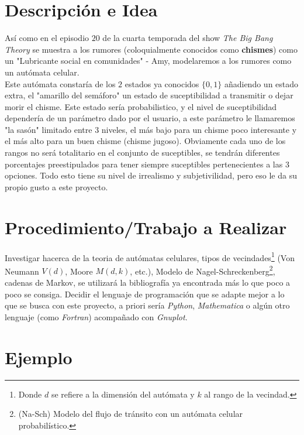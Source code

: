 \vspace{0.5cm}

\section*{Descripción e Idea}

\noindent Así como en el episodio $20$ de la cuarta temporada del show \textit{The Big Bang Theory} se muestra a los rumores (coloquialmente conocidos como \textbf{chismes}) como un "Lubricante social en comunidades" - Amy, modelaremos a los rumores como un autómata celular. \\


\noindent Este autómata constaría de los $2$ estados ya conocidos $\{ 0,1 \}$ añadiendo un estado extra, el "amarillo del semáforo" un estado de suceptibilidad a transmitir o dejar morir el chisme. Este estado sería probabilistico, y el nivel de suceptibilidad dependería de un parámetro dado por el usuario, a este parámetro le llamaremos "la sasón" limitado entre $3$ niveles, el más bajo para un chisme poco interesante y el más alto para un buen chisme (chisme jugoso). Obviamente cada uno de los rangos no será totalitario en el conjunto de suceptibles, se tendrán diferentes porcentajes preestipulados para tener siempre suceptibles pertenecientes a las $3$ opciones. Todo esto tiene su nivel de irrealismo y subjetivilidad, pero eso le da su propio gusto a este proyecto.



\section*{Procedimiento/Trabajo a Realizar}

\noindent Investigar hacerca de la teoria de autómatas celulares, tipos de vecindades\footnote{Donde $d$ se refiere a la dimensión del autómata y $k$ al rango de la vecindad.} (Von Neumann $V(d)$, Moore $M(d,k)$, etc.), Modelo de Nagel-Schreckenberg\footnote{(Na-Sch) Modelo del flujo de tránsito con un autómata celular probabilístico.}, cadenas de Markov, se utilizará la bibliografía ya encontrada más lo que poco a poco se consiga. Decidir el lenguaje de programación que se adapte mejor a lo que se busca con este proyecto, a priori sería \textit{Python}, \textit{Mathematica} o algún otro lenguaje (como \textit{Fortran}) acompañado con \textit{Gnuplot}. 


\section*{Ejemplo}

